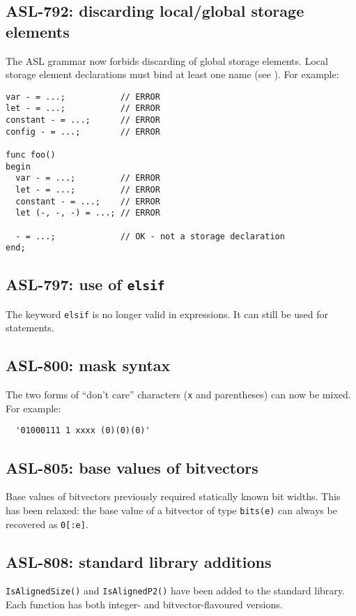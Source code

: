 \subsection{ASL-792: discarding local/global storage elements}
The ASL grammar now forbids discarding of global storage elements.
Local storage element declarations must bind at least one name (see ).
For example:
\begin{lstlisting}
var - = ...;           // ERROR
let - = ...;           // ERROR
constant - = ...;      // ERROR
config - = ...;        // ERROR

func foo()
begin
  var - = ...;         // ERROR
  let - = ...;         // ERROR
  constant - = ...;    // ERROR
  let (-, -, -) = ...; // ERROR

  - = ...;             // OK - not a storage declaration
end;
\end{lstlisting}

\subsection{ASL-797: use of \texttt{elsif}}
The keyword \texttt{elsif} is no longer valid in expressions.
It can still be used for statements.

\subsection{ASL-800: mask syntax}
The two forms of ``don't care'' characters (\texttt{x} and parentheses) can now be mixed.
For example:
\begin{lstlisting}
  '01000111 1 xxxx (0)(0)(0)'
\end{lstlisting}

\subsection{ASL-805: base values of bitvectors}
Base values of bitvectors previously required statically known bit widths.
This has been relaxed: the base value of a bitvector of type \texttt{bits(e)} can always be recovered as \texttt{0[:e]}.

\subsection{ASL-808: standard library additions}
\texttt{IsAlignedSize()} and \texttt{IsAlignedP2()} have been added to the standard library.
Each function has both integer- and bitvector-flavoured versions.


